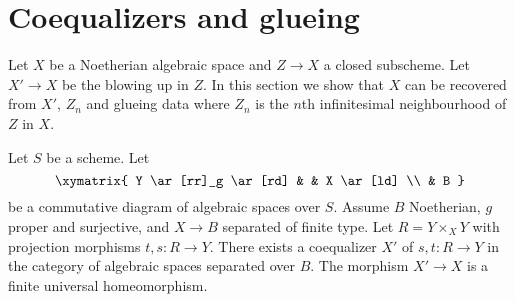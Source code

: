 







\section{Coequalizers and glueing}
\label{section-coequalizer-glue}

\noindent
Let $X$ be a Noetherian algebraic space and $Z \to X$ a closed subscheme.
Let $X' \to X$ be the blowing up in $Z$. In this section we show that
$X$ can be recovered from $X'$, $Z_n$ and glueing data where $Z_n$
is the $n$th infinitesimal neighbourhood of $Z$ in $X$.

\begin{lemma}
\label{lemma-coequalizer}
Let $S$ be a scheme. Let
$$
\xymatrix{
Y \ar[rr]_g \ar[rd] & & X \ar[ld] \\
& B
}
$$
be a commutative diagram of algebraic spaces over $S$. Assume
$B$ Noetherian, $g$ proper and surjective, and $X \to B$ separated
of finite type. Let $R = Y \times_X Y$ with projection morphisms
$t, s : R \to Y$.  There exists a coequalizer $X'$ of $s, t : R \to Y$
in the category of algebraic spaces separated over $B$. The morphism
$X' \to X$ is a finite universal homeomorphism.
\end{lemma}

